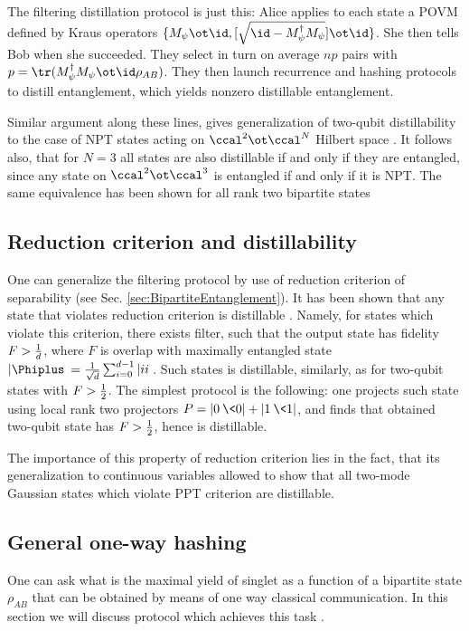 \documentclass[rmp,12pt,preprint]{revtex4-2}
\begin{document}
The filtering distillation protocol is just this: Alice applies to
each state a POVM defined by Kraus operators $\{M_{\psi}\ot
\id,[\sqrt{\id - M_{\psi}^{\dagger}M_{\psi}}]\ot \id\}$. She then
tells Bob when she succeeded. They select in turn on average $np$
pairs with $p={\tr}(M_{\psi}^{\dagger}M_{\psi}\ot \id
\rho_{AB})$. They then launch recurrence and hashing protocols to
distill entanglement, which yields nonzero distillable entanglement.

Similar argument along these lines, gives generalization of two-qubit
distillability to the case of NPT states acting on
$\ccal^{2}\ot\ccal^{N}$ Hilbert space \cite{DurCirac_activation,DurCLB1999-npt-bound}. It follows also, that for $N=3$
all states are also distillable if and only if they are entangled,
since any state on $\ccal^{2}\ot\ccal^3$ is entangled if and only if
it is NPT. The same equivalence has been shown for all rank two bipartite states \cite{Noiseless}

\subsection{Reduction criterion and distillability}
One can generalize the filtering protocol by use of reduction
criterion of separability (see Sec.
\ref{sec:BipartiteEntanglement}). It has been shown that any state
that violates reduction criterion is distillable \cite{reduction}.
Namely, for states which violate this criterion, there exists
filter, such that the output state has fidelity $F>{1\over d}$, where $F$
is overlap with maximally entangled state
$|\Phiplus\>={1\over \sqrt{d}}\sum_{i=0}^{d-1}|ii\>$. Such states is
distillable,  similarly, as for two-qubit states with $F>{1\over 2}$. The
simplest protocol  \cite{BraunsteinCJLS1998-nmr} is the following:
one projects such state using local rank two projectors
$P=|0\>\<0|+|1\>\<1|$, and finds that obtained two-qubit state has
$F>{1\over 2}$, hence is distillable.

The importance of this property of reduction criterion lies in the
fact, that its generalization to continuous variables allowed to
show that all two-mode Gaussian states which violate PPT criterion
are distillable.

\subsection{General one-way hashing}
\label{subsec:genhash}

One can ask what is the maximal yield of singlet as a function of a
bipartite state $\rho_{AB}$ that can be obtained by means of one way
classical communication.  In this section we will discuss protocol
which achieves this task \cite{DevetakWinter-hash,SW-nature,sw-long}.
\end{document}
